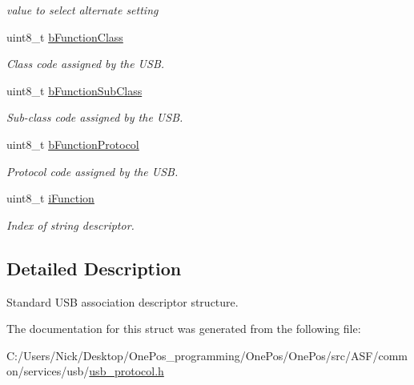 \begin{DoxyCompactItemize}
\begin{DoxyCompactList}\small\item\em value to select alternate setting \end{DoxyCompactList}\item 
\hypertarget{structusb__iad__desc__t_ae013d91f59930b0343201cfe6d5ad82b}{uint8\-\_\-t \hyperlink{structusb__iad__desc__t_ae013d91f59930b0343201cfe6d5ad82b}{b\-Function\-Class}}\label{structusb__iad__desc__t_ae013d91f59930b0343201cfe6d5ad82b}

\begin{DoxyCompactList}\small\item\em Class code assigned by the U\-S\-B. \end{DoxyCompactList}\item 
\hypertarget{structusb__iad__desc__t_a32c8d93140dbad4009d6a0027b3ac6f2}{uint8\-\_\-t \hyperlink{structusb__iad__desc__t_a32c8d93140dbad4009d6a0027b3ac6f2}{b\-Function\-Sub\-Class}}\label{structusb__iad__desc__t_a32c8d93140dbad4009d6a0027b3ac6f2}

\begin{DoxyCompactList}\small\item\em Sub-\/class code assigned by the U\-S\-B. \end{DoxyCompactList}\item 
\hypertarget{structusb__iad__desc__t_ac9ddebd0442428896e30837a4b52f771}{uint8\-\_\-t \hyperlink{structusb__iad__desc__t_ac9ddebd0442428896e30837a4b52f771}{b\-Function\-Protocol}}\label{structusb__iad__desc__t_ac9ddebd0442428896e30837a4b52f771}

\begin{DoxyCompactList}\small\item\em Protocol code assigned by the U\-S\-B. \end{DoxyCompactList}\item 
\hypertarget{structusb__iad__desc__t_a43d33cc1c219b1cac0c340dbcf1ec107}{uint8\-\_\-t \hyperlink{structusb__iad__desc__t_a43d33cc1c219b1cac0c340dbcf1ec107}{i\-Function}}\label{structusb__iad__desc__t_a43d33cc1c219b1cac0c340dbcf1ec107}

\begin{DoxyCompactList}\small\item\em Index of string descriptor. \end{DoxyCompactList}\end{DoxyCompactItemize}


\subsection{Detailed Description}
Standard U\-S\-B association descriptor structure. 

The documentation for this struct was generated from the following file\-:\begin{DoxyCompactItemize}
\item 
C\-:/\-Users/\-Nick/\-Desktop/\-One\-Pos\-\_\-programming/\-One\-Pos/\-One\-Pos/src/\-A\-S\-F/common/services/usb/\hyperlink{usb__protocol_8h}{usb\-\_\-protocol.\-h}\end{DoxyCompactItemize}
